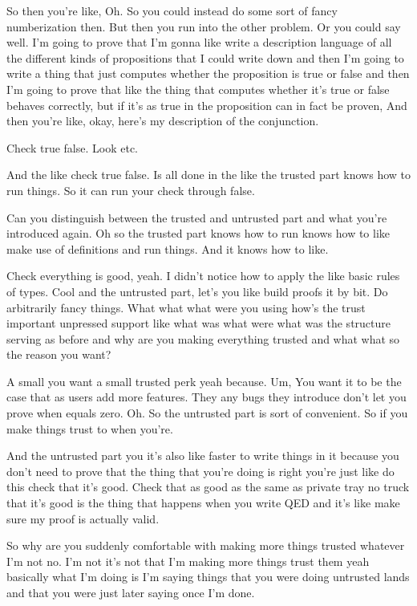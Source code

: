 \begin{subappendices}
    So then you're like, Oh. So you could instead do some sort of fancy numberization then. But then you run into the other problem. Or you could say well. I'm going to prove that I'm gonna like write a description language of all the different kinds of propositions that I could write down and then I'm going to write a thing that just computes whether the proposition is true or false and then I'm going to prove that like the thing that computes whether it's true or false behaves correctly, but if it's as true in the proposition can in fact be proven, And then you're like, okay, here's my description of the conjunction. 
    
    Check true false. Look etc. 
    
    And the like check true false. Is all done in the like the trusted part knows how to run things. So it can run your check through false. 
    
    Can you distinguish between the trusted and untrusted part and what you're introduced again. Oh so the trusted part knows how to run knows how to like make use of definitions and run things. And it knows how to like. 
    
    Check everything is good, yeah. I didn't notice how to apply the like basic rules of types. Cool and the untrusted part, let's you like build proofs it by bit. Do arbitrarily fancy things. What what what were you using how's the trust important unpressed support like what was what were what was the structure serving as before and why are you making everything trusted and what what so the reason you want? 
    
    A small you want a small trusted perk yeah because. Um, You want it to be the case that as users add more features. They any bugs they introduce don't let you prove when equals zero. Oh. So the untrusted part is sort of convenient. So if you make things trust to when you're. 
    
    And the untrusted part you it's also like faster to write things in it because you don't need to prove that the thing that you're doing is right you're just like do this check that it's good. Check that as good as the same as private tray no truck that it's good is the thing that happens when you write QED and it's like make sure my proof is actually valid. 
    
    So why are you suddenly comfortable with making more things trusted whatever I'm not no. I'm not it's not that I'm making more things trust them yeah basically what I'm doing is I'm saying things that you were doing untrusted lands and that you were just later saying once I'm done. 
    

\end{subappendices}
